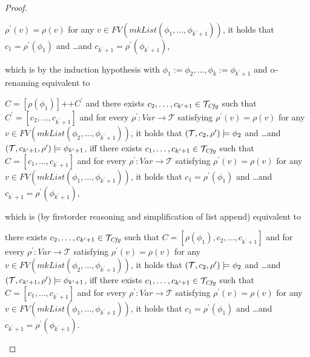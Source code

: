 \begin{proof}
\begin{itemize}
\begin{proofenv}
    $\rho^\prime(v) = \rho(v)$ for any
    $v \in \mathit{FV}(\mathit{mkList}(\phi_1, \ldots, \phi_{k^\prime + 1}))$,
    it holds that
    $c_1 = \rho^\prime(\phi_1)$ and \ldots and $c_{k^\prime + 1} = \rho^\prime(\phi_{k^\prime + 1})$,
    \end{proofenv}
    which is by the induction hypothesis with $\phi_1 := \phi_2,\ldots,\phi_k := \phi_{k^\prime + 1}$
    and $\alpha$-renaming
    equivalent to
    \begin{proofenv}
    $C = [\rho(\phi_1)] \texttt{++} C^\prime$ and
    there exists $c_2, \ldots, c_{k^\prime + 1} \in \mathcal{T}_{\mathit{Cfg}}$ such that $C^\prime = [c_2, \ldots, c_{k^\prime+1}]$ 
    and for every $\rho^\prime : \mathit{Var} \to \mathcal{T}$ satisfying
    $\rho^\prime(v) = \rho(v)$ for any
    $v \in \mathit{FV}(\mathit{mkList}(\phi_2, \ldots, \phi_{k^\prime+1}))$,
    it holds that
    $(\mathcal{T}, c_2, \rho^\prime) \models \phi_2$ and \ldots and $(\mathcal{T}, c_{k^\prime+1}, \rho^\prime) \models \phi_{k^\prime + 1}$,
    iff there exists $c_1, \ldots, c_{k^\prime + 1} \in \mathcal{T}_{\mathit{Cfg}}$ such that $C = [c_1, \ldots, c_{k^\prime + 1}]$
    and for every $\rho^\prime : \mathit{Var} \to \mathcal{T}$ satisfying
    $\rho^\prime(v) = \rho(v)$ for any
    $v \in \mathit{FV}(\mathit{mkList}(\phi_1, \ldots, \phi_{k^\prime + 1}))$,
    it holds that
    $c_1 = \rho^\prime(\phi_1)$ and \ldots and $c_{k^\prime + 1} = \rho^\prime(\phi_{k^\prime + 1})$,
    \end{proofenv}
    which is (by firstorder reasoning and simplification of list append) equivalent to
    \begin{proofenv}
    there exists $c_2, \ldots, c_{k^\prime + 1} \in \mathcal{T}_{\mathit{Cfg}}$ such that
    $C = [\rho(\phi_1), c_2, \ldots, c_{k^\prime+1}]$
    and for every $\rho^\prime : \mathit{Var} \to \mathcal{T}$ satisfying
    $\rho^\prime(v) = \rho(v)$ for any
    $v \in \mathit{FV}(\mathit{mkList}(\phi_2, \ldots, \phi_{k^\prime+1}))$,
    it holds that
    $(\mathcal{T}, c_2, \rho^\prime) \models \phi_2$ and \ldots and $(\mathcal{T}, c_{k^\prime+1}, \rho^\prime) \models \phi_{k^\prime+1}$,
    iff there exists $c_1, \ldots, c_{k^\prime + 1} \in \mathcal{T}_{\mathit{Cfg}}$ such that $C = [c_1, \ldots, c_{k^\prime + 1}]$
    and for every $\rho^\prime : \mathit{Var} \to \mathcal{T}$ satisfying
    $\rho^\prime(v) = \rho(v)$ for any
    $v \in \mathit{FV}(\mathit{mkList}(\phi_1, \ldots, \phi_{k^\prime + 1}))$,
    it holds that
    $c_1 = \rho^\prime(\phi_1)$ and \ldots and $c_{k^\prime + 1} = \rho^\prime(\phi_{k^\prime + 1})$.
    \end{proofenv}

\end{itemize}
\end{proof}
